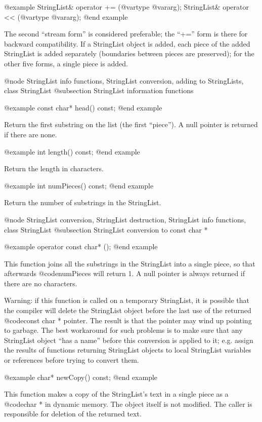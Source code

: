 @example
StringList& operator += (@var{type} @var{arg});
StringList& operator << (@var{type} @var{arg});
@end example

The second ``stream form'' is considered preferable; the ``+='' form is
there for backward compatibility.  If a StringList object is added,
each piece of the added StringList is added separately (boundaries
between pieces are preserved); for the other five forms, a single
piece is added.

@node StringList info functions, StringList conversion, adding to StringLists, class StringList
@subsection StringList information functions

@example
const char* head() const;
@end example

Return the first substring on the list (the first ``piece'').  A null
pointer is returned if there are none.

@example
int length() const;
@end example

Return the length in characters.

@example
int numPieces() const;
@end example

Return the number of substrings in the StringList.

@node StringList conversion, StringList destruction, StringList info functions, class StringList
@subsection StringList conversion to const char *

@example
operator const char* ();
@end example

This function joins all the substrings in the StringList into a
single piece, so that afterwards @code{numPieces} will return 1.
A null pointer is always returned if there are no characters.

Warning: if this function is called on a temporary StringList, it
is possible that the compiler will delete the StringList object
before the last use of the returned @code{const char *} pointer.
The result is that the pointer may wind up pointing to garbage.
The best workaround for such problems is to make sure that any
StringList object ``has a name'' before this conversion is applied
to it; e.g. assign the results of functions returning StringList
objects to local StringList variables or references before trying
to convert them.

@example
char* newCopy() const;
@end example

This function makes a copy of the StringList's text in a single piece
as a @code{char *} in dynamic memory.  The object itself is not modified.
The caller is responsible for deletion of the returned text.

